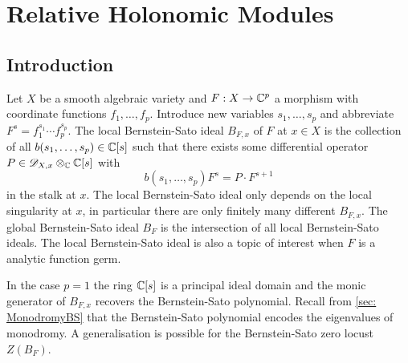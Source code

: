 \chapter{Relative Holonomic Modules}\label{ch: ChapterRelHol}
\section{Introduction}\label{sec: IntoductionChapterRelative}
Let $X$ be a smooth algebraic variety and $F:X\to \mathbb{C}^p$ a morphism with coordinate functions $f_1,\ldots, f_p$.
Introduce new variables $s_1,\ldots, s_p$ and abbreviate $F^s = f_1^{s_1}\cdots f_p^{s_p}$.
The local Bernstein-Sato ideal $B_{F,x}$ of $F$ at $x\in X$ is the collection of all $b(s_1,\ldots,s_p)\in \mathbb{C}[s]$ such that there exists some differential operator $P\in \mathscr{D}_{X,x}\otimes_{\mathbb{C}}\mathbb{C}[s]$ with
$$b(s_1,\ldots,s_p) F^s =  P\cdot F^{s + 1}$$
in the stalk at $x$.
The local Bernstein-Sato ideal only depends on the local singularity at $x$, in particular there are only finitely many different $B_{F,x}$.
The global Bernstein-Sato ideal $B_F$ is the intersection of all local Bernstein-Sato ideals.
The local Bernstein-Sato ideal is also a topic of interest when $F$ is a analytic function germ.

In the case $p=1$ the ring $\mathbb{C}[s]$ is a principal ideal domain and the monic generator of $B_{F,x}$ recovers the Bernstein-Sato polynomial.
Recall from \cref{sec: MonodromyBS} that the Bernstein-Sato polynomial encodes the eigenvalues of monodromy.
A generalisation is possible for the Bernstein-Sato zero locust $Z(B_F)$.

